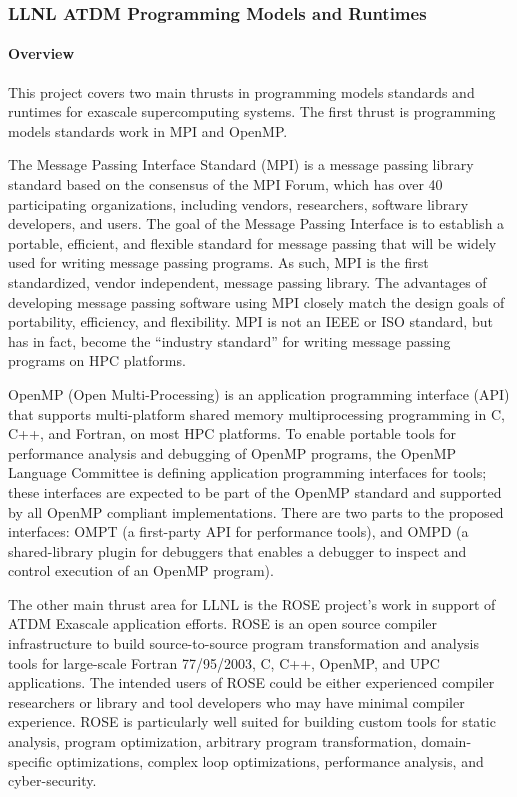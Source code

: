 \subsubsection{LLNL ATDM Programming Models and Runtimes}


\paragraph{Overview} 
This project covers two main thrusts in programming models standards and 
runtimes for exascale supercomputing systems. The first thrust is 
programming models standards work in MPI and OpenMP. 

The Message Passing Interface Standard (MPI) is a message passing library standard based on the consensus of the MPI Forum, which has over 40 participating organizations, including vendors, researchers, software library developers, and users. The goal of the Message Passing Interface is to establish a portable, efficient, and flexible standard for message passing that will be widely used for writing message passing programs. As such, MPI is the first standardized, vendor independent, message passing library. The advantages of developing message passing software using MPI closely match the design goals of portability, efficiency, and flexibility. MPI is not an IEEE or ISO standard, but has in fact, become the ``industry standard'' for writing message passing programs on HPC platforms.

OpenMP (Open Multi-Processing) is an application programming interface (API) that supports multi-platform shared memory multiprocessing programming in C, C++, and Fortran, on most HPC platforms. To enable portable tools for performance analysis and debugging of OpenMP programs, the OpenMP Language Committee is defining application programming interfaces for tools; these interfaces are expected to be part of the OpenMP standard and supported by all OpenMP compliant implementations. There are two parts to the proposed interfaces: OMPT (a first-party API for performance tools), and OMPD (a shared-library plugin for debuggers that enables a debugger to inspect and control execution of an OpenMP program).

The other main thrust area for LLNL is the ROSE project’s work in support of 
ATDM Exascale application efforts.  
ROSE is an open source compiler infrastructure to build source-to-source program transformation and analysis tools for large-scale Fortran 77/95/2003, C, C++, OpenMP, and UPC applications. The intended users of ROSE could be either experienced compiler researchers or library and tool developers who may have minimal compiler experience. ROSE is particularly well suited for building custom tools for static analysis, program optimization, arbitrary program transformation, domain-specific optimizations, complex loop optimizations, performance analysis, and cyber-security.



